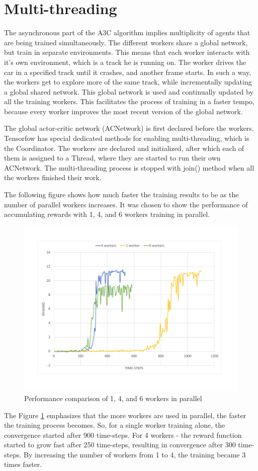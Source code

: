 \section{Multi-threading}\label{Multi-threading}
The asynchronous part of the A3C algorithm implies multiplicity of agents that are being trained simultaneously. The different workers share a global network, but train in separate environments. This means that each worker interacts with it's own environment, which is a track he is running on. The worker drives the car in a specified track until it crashes, and another frame starts. In such a way, the workers get to explore more of the same track, while incrementally updating a global shared network. This global network is used and continually updated by all the training workers. This facilitates the process of training in a faster tempo, because every worker improves the most recent version of the global network.

The global actor-critic network (ACNetwork) is first declared before the workers. Tensorfow has special dedicated methods for enabling multi-threading, which is the Coordinator. The workers are declared and initialized, after which each of them is assigned to a Thread, where they are started to run their own ACNetwork. The multi-threading process is stopped with join() method when all the workers finished their work.

The following figure shows how much faster the training results to be as the number of parallel workers increases. It was chosen to show the performance of accumulating rewards with 1, 4, and  6 workers training in parallel.
\begin{figure}[H]
	\centering
	\includegraphics[width=\textwidth]{Figures/Workers}
	\caption{Performance comparison of 1, 4, and 6 workers in parallel}
	\label{fig:Workers}
\end{figure}
 The Figure \ref{fig:Workers} emphasizes that the more workers are used in parallel, the faster the training process becomes. So, for a single worker training alone, the convergence started after 900 time-steps. For 4 workers - the reward function started to grow fast after 250 time-steps, resulting in convergence after 300 time-steps. By increasing the number of workers from 1 to 4, the training became 3 times faster.
 
